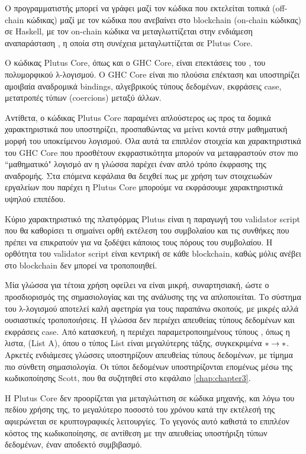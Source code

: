 Ο προγραμματιστής
μπορεί να γράφει μαζί τον κώδικα που εκτελείται τοπικά (off-chain κώδικας) μαζί με τον κώδικα που
ανεβαίνει στο blockchain (on-chain κώδικας) σε Haskell, με τον on-chain κώδικα να μεταγλωττίζεται στην
ενδιάμεση αναπαράσταση \FIR{},  η οποία
στη συνέχεια μεταγλωττίζεται σε Plutus Core.


Ο κώδικας Plutus Core, όπως και ο GHC Core, είναι επεκτάσεις του \FOM{}, του πολυμορφικού λ-λογισμού.
Ο GHC Core είναι πιο πλούσια επέκταση και υποστηρίζει αμοιβαία αναδρομικά bindings, αλγεβρικούς
τύπους δεδομένων, εκφράσεις case, μετατροπές τύπων (coercions) μεταξύ άλλων.

Αντίθετα, ο κώδικας Plutus Core παραμένει απλούστερος ως προς τα δομικά χαρακτηριστικά που
υποστηρίζει, προσπαθώντας να μείνει κοντά στην μαθηματική μορφή του υποκείμενου λογισμού.
Όλα αυτά τα επιπλέον στοιχεία και χαρακτηριστικά του GHC Core που προσθέτουν εκφραστικότητα
μπορούν να μεταφραστούν στον πιο ``μαθηματικό" λογισμό αν η γλώσσα παρέχει έναν απλό τρόπο
έκφρασης της αναδρομής. Στα επόμενα κεφάλαια θα δειχθεί πως με χρήση των στοιχειωδών
εργαλείων που παρέχει η Plutus Core μπορούμε να εκφράσουμε χαρακτηριστικά υψηλού επιπέδου.

Κύριο χαρακτηριστικό της πλατφόρμας Plutus είναι η παραγωγή του validator script που θα
καθορίσει τι σημαίνει ορθή εκτέλεση του συμβολαίου και τις συνθήκες που πρέπει να επικρατούν
για να ξοδέψει κάποιος τους πόρους του συμβολαίου. Η ορθότητα του validator script είναι
κεντρική σε κάθε blockchain, καθώς μόλις ανέβει στο blockchain δεν μπορεί να τροποποιηθεί.

Μία γλώσσα για τέτοια χρήση οφείλει να είναι μικρή, συναρτησιακή, ώστε ο προσδιορισμός της
σημασιολογίας και της ανάλυσης της να απλοποιείται. Το σύστημα του λ-λογισμού \FOM{} αποτελεί
καλή αφετηρία για τους παραπάνω σκοπούς, με μικρές αλλά ουσιαστικές τροποποιήσεις. Η γλώσσα
δεν περιέχει απευθείας τύπους δεδομένων και εκφράσεις case. Από κατασκευή, η \FOM{} περιέχει
παραμετροποιημένους τύπους , όπως η λιστα, (List A), όπου ο τύπος List είναι μεγαλύτερης τάξης,
συγκεκριμένα $\operatorname{\ast} \rightarrow \operatorname{\ast}$. Αρκετές ενδιάμεσες γλώσσες υποστηρίζουν απευθείας
τύπους δεδομένων, με τίμημα πιο σύνθετη σημασιολογία. Οι τύποι δεδομένων υποστηρίζονται
επομένως μέσω της κωδικοποίησης Scott, που θα συζητηθεί στο κεφάλαιο \ref{chap:chapter3}.

Η Plutus Core δεν προορίζεται για μεταγλώττιση σε κώδικα μηχανής, και λόγω του πεδίου χρήσης
της, το μεγαλύτερο ποσοστό του χρόνου κατά την εκτέλεσή της αφιερώνεται σε κρυπτογραφικές
λειτουργίες. Το γεγονός αυτό καθιστά το επιπλέον κόστος της κωδικοποίησης, σε αντίθεση με την
απευθείας υποστήριξη τύπων δεδομένων, έναν αποδεκτό συμβιβασμό.

